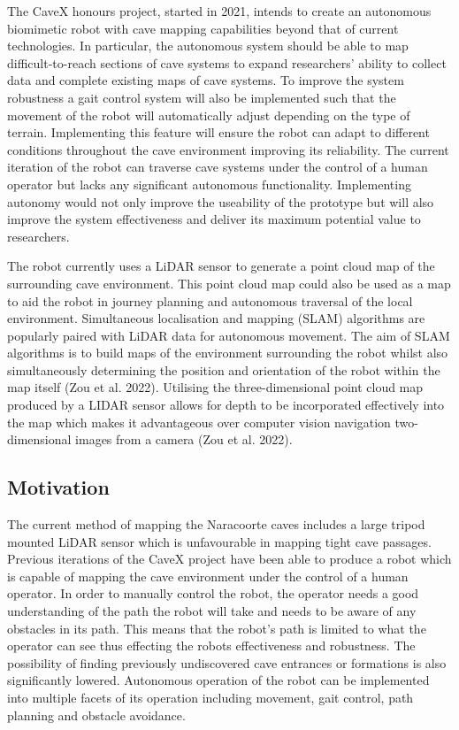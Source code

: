 The CaveX honours project, started in 2021, intends to create an autonomous biomimetic robot with cave mapping capabilities beyond that of current technologies. In particular, the autonomous system should be able to map difficult-to-reach sections of cave systems to expand researchers’ ability to collect data and complete existing maps of cave systems. To improve the system robustness a gait control system will also be implemented such that the movement of the robot will automatically adjust depending on the type of terrain. Implementing this feature will ensure the robot can adapt to different conditions throughout the cave environment improving its reliability. The current iteration of the robot can traverse cave systems under the control of a human operator but lacks any significant autonomous functionality. Implementing autonomy would not only improve the useability of the prototype but will also improve the system effectiveness and deliver its maximum potential value to researchers.


The robot currently uses a LiDAR sensor to generate a point cloud map of the surrounding cave environment. This point cloud map could also be used as a map to aid the robot in journey planning and autonomous traversal of the local environment. Simultaneous localisation and mapping (SLAM) algorithms are popularly paired with LiDAR data for autonomous movement. The aim of SLAM algorithms is to build maps of the environment surrounding the robot whilst also simultaneously determining the position and orientation of the robot within the map itself (Zou et al. 2022). Utilising the three-dimensional point cloud map produced by a LIDAR sensor allows for depth to be incorporated effectively into the map which makes it advantageous over computer vision navigation two-dimensional images from a camera (Zou et al. 2022).

\subsection{Motivation}
The current method of mapping the Naracoorte caves includes a large tripod mounted LiDAR sensor which is unfavourable in mapping tight cave passages. Previous iterations of the CaveX project have been able to produce a robot which is capable of mapping the cave environment under the control of a human operator. In order to manually control the robot, the operator needs a good understanding of the path the robot will take and needs to be aware of any obstacles in its path. This means that the robot's path is limited to what the operator can see thus effecting the robots effectiveness and robustness. The possibility of finding previously undiscovered cave entrances or formations is also significantly lowered. Autonomous operation of the robot can be implemented into multiple facets of its operation including movement, gait control, path planning and obstacle avoidance.

